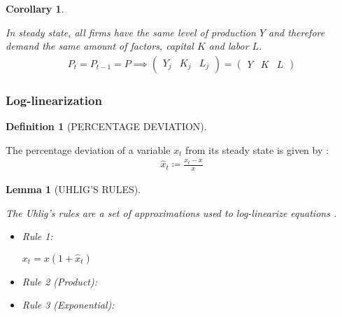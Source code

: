 \documentclass[
	12pt, 
	]{article}
\numberwithin{equation}{section}
\theoremstyle{definition}
\newtheorem{definition}{Definition}[section]
\theoremstyle{plain}
\theoremstyle{plain}
\newtheorem{lemma}{Lemma}[section]
\theoremstyle{plain}
\newtheorem{corollary}{Corollary}[lemma]
\begin{document}
\begin{corollary}\label{coro:steady-state-YKL}
	
	In steady state, all firms have the same level of production $Y$ and therefore demand the same amount of factors, capital $K$ and labor $L$.
	\begin{align*}
		P_t = P_{t-1} = P \implies 
		\begin{pmatrix}
			Y_j & K_j & L_j
		\end{pmatrix} =
		\begin{pmatrix}
			Y & K & L
		\end{pmatrix}
	\end{align*}
	
\end{corollary}


\subsubsection{Log-linearization}


\begin{definition}[PERCENTAGE DEVIATION]\label{def:percentage-deviation}
	
	The percentage deviation of a variable $x_t$ from its steady state is given by \cite[Lecture 6, p.2]{solis-garcia_ucb_2022}:
	\begin{align}
		\hat{x}_t \coloneq \frac{x_t - x}{x} \label{eq:percentage-deviation}
	\end{align}
		
\end{definition}


\begin{lemma}[UHLIG'S RULES]\label{lemma:uhligs-rules}
	
	The Uhlig's rules are a set of approximations used to log-linearize equations \cite[Lecture 6, p.2]{solis-garcia_ucb_2022}.
	
	\begin{itemize}
		\item Rule 1: \label{uhlig-rule-1}
		
		\( x_t = x(1 + \hat{x}_t) \) 
		
		\item Rule 2 (Product):
		
		
		
		\item Rule 3 (Exponential):
		
		
	\end{itemize}

\end{lemma}
\end{document}
